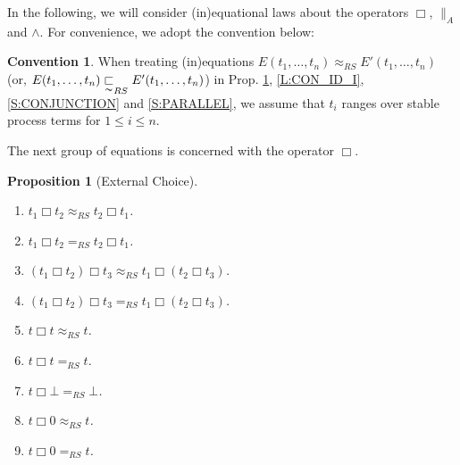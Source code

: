 \documentclass{elsarticle}
\theoremstyle{plain}
\newtheorem{proposition}[theorem]{Proposition}
\theoremstyle{definition}
\newtheorem{convention}[theorem]{Convention}
\begin{document}
In the following, we will consider (in)equational laws about the operators $\Box$, $\parallel_A$ and $\wedge$.
For convenience, we adopt the convention below:

\begin{convention}\label{C:STABLE_TERM}
  When treating (in)equations $E(t_1,\dots,t_n)\approx_{RS}E'(t_1,\dots,t_n)$ (or, $E(t_1,\dots,t_n) \underset{\thicksim}{\sqsubset}_{RS} E'(t_1,\dots,t_n)$) in Prop. \ref{L:EC2}, \ref{L:CON_ID_I}, \ref{S:CONJUNCTION} and \ref{S:PARALLEL}, we assume that $t_i$ ranges over stable process terms for $1 \leq i \leq n$.
\end{convention}

The next group of equations is concerned with the operator $\Box$.

\begin{proposition}[External Choice]\hfill\label{L:EC2}
    \begin{enumerate}
      \item $t_1 \Box t_2 \approx_{RS} t_2 \Box t_1$.
      \item $t_1 \Box t_2 =_{RS} t_2 \Box t_1$.
      \item $(t_1 \Box t_2) \Box t_3 \approx_{RS} t_1 \Box (t_2 \Box t_3)$.
      \item $(t_1 \Box t_2) \Box t_3 =_{RS} t_1 \Box (t_2 \Box t_3)$.
      \item $t \Box t \approx_{RS} t$.
      \item $t \Box t =_{RS} t$.
      \item $t \Box \bot =_{RS} \bot$.
      \item $t \Box 0 \approx_{RS} t$.
      \item $t \Box 0 =_{RS} t$.
    \end{enumerate}
\end{proposition}
\end{document}
